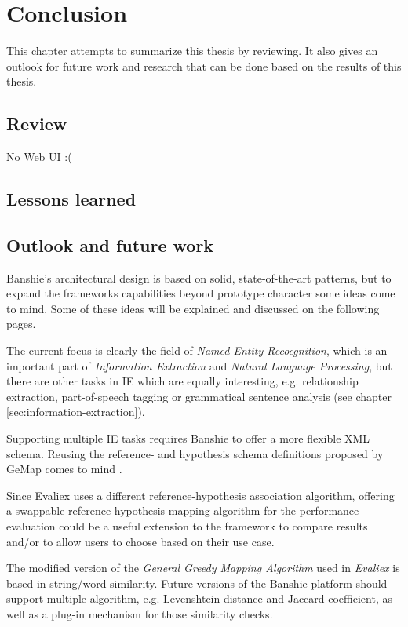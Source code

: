 \section{Conclusion}
\label{sec:conclusion}
This chapter attempts to summarize this thesis by reviewing. It also gives an outlook for future work and research that can be done based on the results of this thesis.

\subsection{Review}
No Web UI :(

\subsection{Lessons learned}

\subsection{Outlook and future work}
Banshie's architectural design is based on solid, state-of-the-art patterns, but to expand the frameworks capabilities beyond prototype character some ideas come to mind. Some of these ideas will be explained and discussed on the following pages.

The current focus is clearly the field of \textit{Named Entity Recocgnition}, which is an important part of \textit{Information Extraction} and \textit{Natural Language Processing}, but there are other tasks in \gls{IE} which are equally interesting, e.g. relationship extraction, part-of-speech tagging or grammatical sentence analysis (see chapter \ref{sec:information-extraction}).

Supporting multiple \gls{IE} tasks requires Banshie to offer a more flexible XML schema. Reusing the reference- and hypothesis schema definitions proposed by GeMap comes to mind \cite{Linsmayr:2010b}.

Since Evaliex uses a different reference-hypothesis association algorithm, offering a swappable reference-hypothesis mapping algorithm for the performance evaluation could be a useful extension to the framework to compare results and/or to allow users to choose based on their use case.

The modified version of the \textit{General Greedy Mapping Algorithm} used in \textit{Evaliex} is based in string/word similarity. Future versions of the Banshie platform should support multiple algorithm, e.g. Levenshtein distance and Jaccard coefficient, as well as a plug-in mechanism for those similarity checks.

